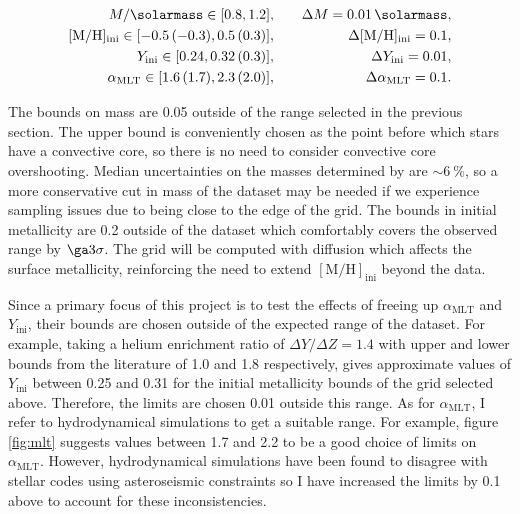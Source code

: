 \documentclass[twocolumn]{aastex63}
\newcommand{\Yini}{Y_{\mathrm{ini}}}
\newcommand{\mlt}{\alpha_{\mathrm{MLT}}}
\newcommand{\metallicity}{[\mathrm{M} / \mathrm{H}]}
\begin{document}
\begin{eqnarray*}
    M / \si{\solarmass} \in [0.8, 1.2], &\quad& \Delta M = \SI{0.01}{\solarmass},\\
    \metallicity_{\mathrm{ini}} \in [-0.5\,(-0.3), 0.5\,(0.3)], &\quad& \Delta\metallicity_{\mathrm{ini}} = 0.1,\\
    \Yini \in [0.24, 0.32\,(0.3)], &\quad& \Delta\Yini = 0.01,\\
    \mlt \in [1.6\,(1.7), 2.3\,(2.0)], &\quad& \Delta\mlt = 0.1.
\end{eqnarray*}  

The bounds on mass are \SI{0.05}{\solarmass} outside of the range selected in the previous section. The upper bound is conveniently chosen as the point before which stars have a convective core, so there is no need to consider convective core overshooting. Median uncertainties on the masses determined by  are $\sim \SI{6}{\percent}$, so a more conservative cut in mass of the dataset may be needed if we experience sampling issues due to being close to the edge of the grid. The bounds in initial metallicity are \SI{0.2}{\dex} outside of the dataset which comfortably covers the observed range by $\ga 3\sigma$. The grid will be computed with diffusion which affects the surface metallicity, reinforcing the need to extend $\metallicity_{\mathrm{ini}}$ beyond the data.

Since a primary focus of this project is to test the effects of freeing up $\mlt$ and $\Yini$, their bounds are chosen outside of the expected range of the dataset. For example, taking a helium enrichment ratio of $\Delta Y/ \Delta Z = 1.4$ \citep{brogaardAgeHeliumContent-2012} with upper and lower bounds from the literature of 1.0 and 1.8 respectively, gives approximate values of $\Yini$ between \num{0.25} and \num{0.31} for the initial metallicity bounds of the grid selected above. Therefore, the limits are chosen \num{0.01} outside this range. As for $\mlt$, I refer to hydrodynamical simulations \citep[e.g.][]{Trampedach.Stein.ea2014, Magic.Weiss.ea2015} to get a suitable range. For example, figure \ref{fig:mlt} suggests values between \num{1.7} and \num{2.2} to be a good choice of limits on $\mlt$. However, hydrodynamical simulations have been found to disagree with stellar codes using asteroseismic constraints \citep[e.g. see Fig. 9 of][]{SilvaAguirre.Lund.ea2017} so I have increased the limits by \num{0.1} above to account for these inconsistencies.
\end{document}
